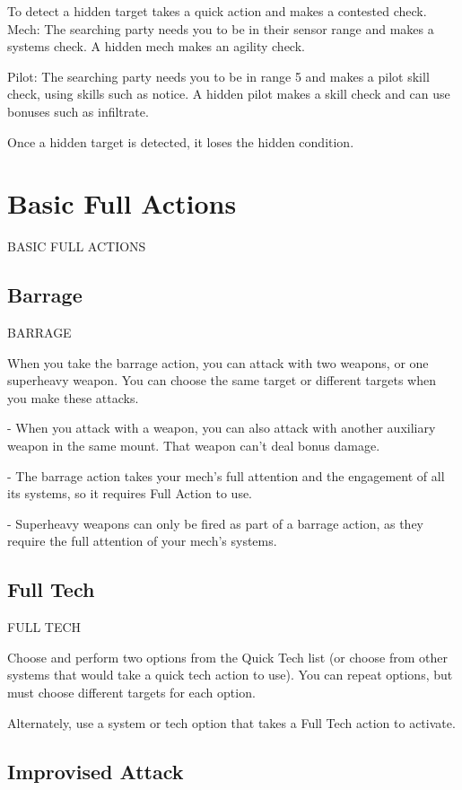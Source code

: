 To detect a hidden target takes a quick action and makes a contested check.
         Mech: The searching party needs you to be in their sensor range and makes a systems
         check. A hidden mech makes an agility check.

         Pilot: The searching party needs you to be in range 5 and makes a pilot skill check, using
         skills such as notice. A hidden pilot makes a skill check and can use bonuses such as
         infiltrate.

Once a hidden target is detected, it loses the hidden condition.

\section{Basic Full Actions}BASIC FULL ACTIONS
\subsection{Barrage}
                                               BARRAGE

When you take the barrage action, you can attack with two weapons, or one superheavy
weapon. You can choose the same target or different targets when you make these attacks.

        	- When you attack with a weapon, you can also attack with another auxiliary weapon in
        the same mount. That weapon can’t deal bonus damage.

        	- The barrage action takes your mech’s full attention and the engagement of all its
        systems, so it requires Full Action to use.

        	- Superheavy weapons can only be fired as part of a barrage action, as they require the
        full attention of your mech’s systems.
\subsection{Full Tech}
                                              FULL TECH

Choose and perform two options from the Quick Tech list (or choose from other systems that
would take a quick tech action to use). You can repeat options, but must choose different targets
for each option.


Alternately, use a system or tech option that takes a Full Tech action to activate.
 \subsection{Improvised Attack}

